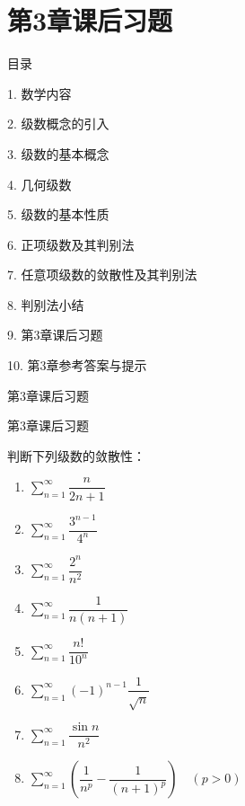 \documentclass[aspectratio=169,10pt,fontset=fandol]{ctexbeamer}
\begin{document}
\section{第3章课后习题}
\begin{frame}[t,fragile]{目录}
\normalsize
{\color{black}\normalsize 1. 数学内容\par}\vspace{0.3em}
{\color{black}\normalsize 2. 级数概念的引入\par}\vspace{0.3em}
{\color{black}\normalsize 3. 级数的基本概念\par}\vspace{0.3em}
{\color{black}\normalsize 4. 几何级数\par}\vspace{0.3em}
{\color{black}\normalsize 5. 级数的基本性质\par}\vspace{0.3em}
{\color{black}\normalsize 6. 正项级数及其判别法\par}\vspace{0.3em}
{\color{black}\normalsize 7. 任意项级数的敛散性及其判别法\par}\vspace{0.3em}
{\color{black}\normalsize 8. 判别法小结\par}\vspace{0.3em}
{\color{blue}\normalsize 9. 第3章课后习题\par}\vspace{0.3em}
{\color{gray!40}\normalsize 10. 第3章参考答案与提示\par}\vspace{0.3em}
\end{frame}
\begin{frame}[t,fragile]{第3章课后习题}
\small
{\small


}
\end{frame}
\begin{frame}[t,fragile]{第3章课后习题}
\small
{\small

判断下列级数的敛散性：

\begin{enumerate}
\item \(\sum_{n=1}^{\infty} \dfrac{n}{2n+1}\)
\item \(\sum_{n=1}^{\infty} \dfrac{3^{n-1}}{4^n}\)
\item \(\sum_{n=1}^{\infty} \dfrac{2^n}{n^2}\)
\item \(\sum_{n=1}^{\infty} \dfrac{1}{n(n+1)}\)
\item \(\sum_{n=1}^{\infty} \dfrac{n!}{10^n}\)
\item \(\sum_{n=1}^{\infty} (-1)^{n-1} \dfrac{1}{\sqrt{n}}\)
\item \(\sum_{n=1}^{\infty} \dfrac{\sin n}{n^2}\)
\item \(\sum_{n=1}^{\infty} \left(\dfrac{1}{n^p} - \dfrac{1}{(n+1)^p}\right) \quad (p>0)\)
\end{enumerate}

}
\end{frame}
\end{document}
